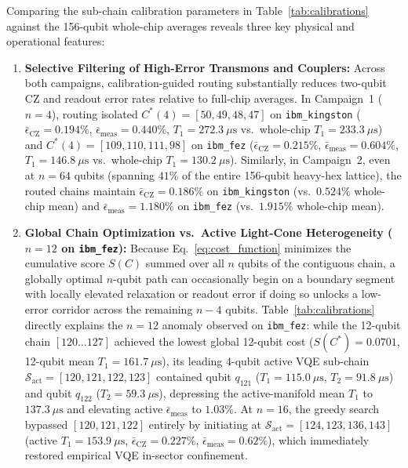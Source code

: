 \documentclass[aps,pra,reprint,superscriptaddress,floatfix,nofootinbib]{revtex4-2}
\begin{document}
Comparing the sub-chain calibration parameters in Table~\ref{tab:calibrations} against the 156-qubit whole-chip averages reveals three key physical and operational features:
\begin{enumerate}
    \item \textbf{Selective Filtering of High-Error Transmons and Couplers:} Across both campaigns, calibration-guided routing substantially reduces two-qubit CZ and readout error rates relative to full-chip averages. In Campaign~1 ($n = 4$), routing isolated $C^*(4) = [50, 49, 48, 47]$ on \texttt{ibm\_kingston} ($\bar{\epsilon}_{\text{CZ}} = 0.194\%$, $\bar{\epsilon}_{\text{meas}} = 0.440\%$, $T_1 = 272.3\ \mu\text{s}$ vs.\ whole-chip $T_1 = 233.3\ \mu\text{s}$) and $C^*(4) = [109, 110, 111, 98]$ on \texttt{ibm\_fez} ($\bar{\epsilon}_{\text{CZ}} = 0.215\%$, $\bar{\epsilon}_{\text{meas}} = 0.604\%$, $T_1 = 146.8\ \mu\text{s}$ vs.\ whole-chip $T_1 = 130.2\ \mu\text{s}$). Similarly, in Campaign~2, even at $n = 64$ qubits (spanning $41\%$ of the entire 156-qubit heavy-hex lattice), the routed chains maintain $\bar{\epsilon}_{\text{CZ}} = 0.186\%$ on \texttt{ibm\_kingston} (vs.\ $0.524\%$ whole-chip mean) and $\bar{\epsilon}_{\text{meas}} = 1.180\%$ on \texttt{ibm\_fez} (vs.\ $1.915\%$ whole-chip mean).
    \item \textbf{Global Chain Optimization vs.\ Active Light-Cone Heterogeneity ($n = 12$ on \texttt{ibm\_fez}):} Because Eq.~\eqref{eq:cost_function} minimizes the cumulative score $S(C)$ summed over all $n$ qubits of the contiguous chain, a globally optimal $n$-qubit path can occasionally begin on a boundary segment with locally elevated relaxation or readout error if doing so unlocks a low-error corridor across the remaining $n - 4$ qubits. Table~\ref{tab:calibrations} directly explains the $n = 12$ anomaly observed on \texttt{ibm\_fez}: while the 12-qubit chain $[120 \dots 127]$ achieved the lowest global 12-qubit cost ($S(C^*) = 0.0701$, 12-qubit mean $T_1 = 161.7\ \mu\text{s}$), its leading 4-qubit active VQE sub-chain $\mathcal{S}_{\text{act}} = [120, 121, 122, 123]$ contained qubit $q_{121}$ ($T_1 = 115.0\ \mu\text{s}$, $T_2 = 91.8\ \mu\text{s}$) and qubit $q_{122}$ ($T_2 = 59.3\ \mu\text{s}$), depressing the active-manifold mean $T_1$ to $137.3\ \mu\text{s}$ and elevating active $\bar{\epsilon}_{\text{meas}}$ to $1.03\%$. At $n = 16$, the greedy search bypassed $[120, 121, 122]$ entirely by initiating at $\mathcal{S}_{\text{act}} = [124, 123, 136, 143]$ (active $T_1 = 153.9\ \mu\text{s}$, $\bar{\epsilon}_{\text{CZ}} = 0.227\%$, $\bar{\epsilon}_{\text{meas}} = 0.62\%$), which immediately restored empirical VQE in-sector confinement.

\end{enumerate}
\end{document}
